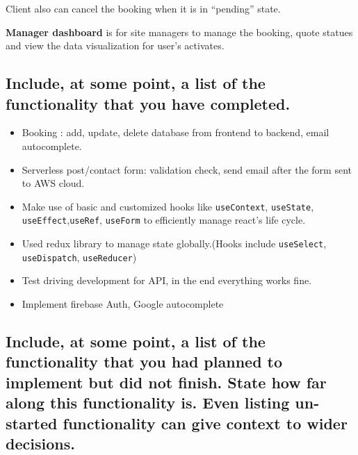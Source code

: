 \documentclass[
  paper=a4,
  ,captions=tableheading
]{scrartcl}
\providecommand{\tightlist}{%
  \setlength{\itemsep}{0pt}\setlength{\parskip}{0pt}}
\begin{document}
Client also can cancel the booking when it is in \enquote{pending}
state.

\textbf{Manager dashboard} is for site managers to manage the booking,
quote statues and view the data visualization for user's activates.

\hypertarget{include-at-some-point-a-list-of-the-functionality-that-you-have-completed.}{%
\subsection{Include, at some point, a list of the functionality that you
have
completed.}\label{include-at-some-point-a-list-of-the-functionality-that-you-have-completed.}}

\begin{itemize}
\tightlist
\item
  Booking : add, update, delete database from frontend to backend, email
  autocomplete.
\item
  Serverless post/contact form: validation check, send email after the
  form sent to AWS cloud.
\item
  Make use of basic and customized hooks like \texttt{useContext},
  \texttt{useState}, \texttt{useEffect},\texttt{useRef},
  \texttt{useForm} to efficiently manage react's life cycle.
\item
  Used redux library to manage state globally.(Hooks include
  \texttt{useSelect}, \texttt{useDispatch}, \texttt{useReducer})
\item
  Test driving development for API, in the end everything works fine.
\item
  Implement firebase Auth, Google autocomplete
\end{itemize}

\hypertarget{include-at-some-point-a-list-of-the-functionality-that-you-had-planned-to-implement-but-did-not-finish.-state-how-far-along-this-functionality-is.-even-listing-un-started-functionality-can-give-context-to-wider-decisions.}{%
\subsection{Include, at some point, a list of the functionality that you
had planned to implement but did not finish. State how far along this
functionality is. Even listing un-started functionality can give context
to wider
decisions.}\label{include-at-some-point-a-list-of-the-functionality-that-you-had-planned-to-implement-but-did-not-finish.-state-how-far-along-this-functionality-is.-even-listing-un-started-functionality-can-give-context-to-wider-decisions.}}
\end{document}
